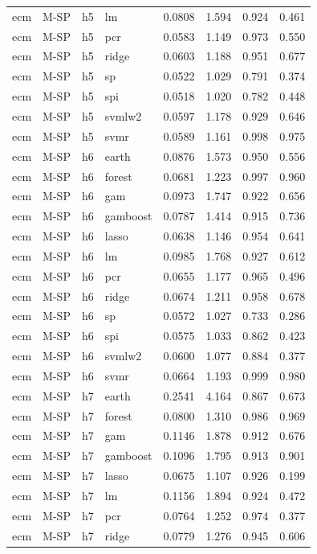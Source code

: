 \begin{ThreePartTable}
\begin{longtable}[t]{llclcccc}
ecm & M-SP & h5 & lm & 0.0808 & 1.594 & 0.924 & 0.461\\
ecm & M-SP & h5 & pcr & 0.0583 & 1.149 & 0.973 & 0.550\\
ecm & M-SP & h5 & ridge & 0.0603 & 1.188 & 0.951 & 0.677\\
ecm & M-SP & h5 & sp & 0.0522 & 1.029 & 0.791 & 0.374\\
ecm & M-SP & h5 & spi & 0.0518 & 1.020 & 0.782 & 0.448\\
ecm & M-SP & h5 & svmlw2 & 0.0597 & 1.178 & 0.929 & 0.646\\
ecm & M-SP & h5 & svmr & 0.0589 & 1.161 & 0.998 & 0.975\\
\addlinespace
ecm & M-SP & h6 & earth & 0.0876 & 1.573 & 0.950 & 0.556\\
ecm & M-SP & h6 & forest & 0.0681 & 1.223 & 0.997 & 0.960\\
ecm & M-SP & h6 & gam & 0.0973 & 1.747 & 0.922 & 0.656\\
ecm & M-SP & h6 & gamboost & 0.0787 & 1.414 & 0.915 & 0.736\\
ecm & M-SP & h6 & lasso & 0.0638 & 1.146 & 0.954 & 0.641\\
ecm & M-SP & h6 & lm & 0.0985 & 1.768 & 0.927 & 0.612\\
ecm & M-SP & h6 & pcr & 0.0655 & 1.177 & 0.965 & 0.496\\
ecm & M-SP & h6 & ridge & 0.0674 & 1.211 & 0.958 & 0.678\\
ecm & M-SP & h6 & sp & 0.0572 & 1.027 & 0.733 & 0.286\\
ecm & M-SP & h6 & spi & 0.0575 & 1.033 & 0.862 & 0.423\\
ecm & M-SP & h6 & svmlw2 & 0.0600 & 1.077 & 0.884 & 0.377\\
ecm & M-SP & h6 & svmr & 0.0664 & 1.193 & 0.999 & 0.980\\
\addlinespace
ecm & M-SP & h7 & earth & 0.2541 & 4.164 & 0.867 & 0.673\\
ecm & M-SP & h7 & forest & 0.0800 & 1.310 & 0.986 & 0.969\\
ecm & M-SP & h7 & gam & 0.1146 & 1.878 & 0.912 & 0.676\\
ecm & M-SP & h7 & gamboost & 0.1096 & 1.795 & 0.913 & 0.901\\
ecm & M-SP & h7 & lasso & 0.0675 & 1.107 & 0.926 & 0.199\\
ecm & M-SP & h7 & lm & 0.1156 & 1.894 & 0.924 & 0.472\\
ecm & M-SP & h7 & pcr & 0.0764 & 1.252 & 0.974 & 0.377\\
ecm & M-SP & h7 & ridge & 0.0779 & 1.276 & 0.945 & 0.606\\

\end{longtable}
\end{ThreePartTable}

